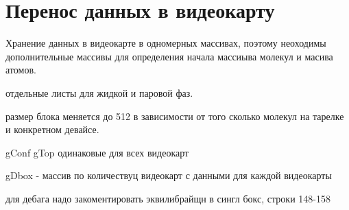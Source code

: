 \section{Перенос данных в видеокарту}

Хранение данных в видеокарте в одномерных массивах, поэтому неоходимы дополнительные массивы для определения начала массиыва молекул и масива атомов.

отдельные листы для жидкой и паровой фаз.

размер блока меняется до 512 в зависимости от того сколько молекул на тарелке и конкретном девайсе.

gConf gTop одинаковые для всех видеокарт

gDbox - массив по количествуц видеокарт с данными для каждой видеокарты

для дебага надо закоментировать эквилибрайщн в сингл бокс, строки 148-158



